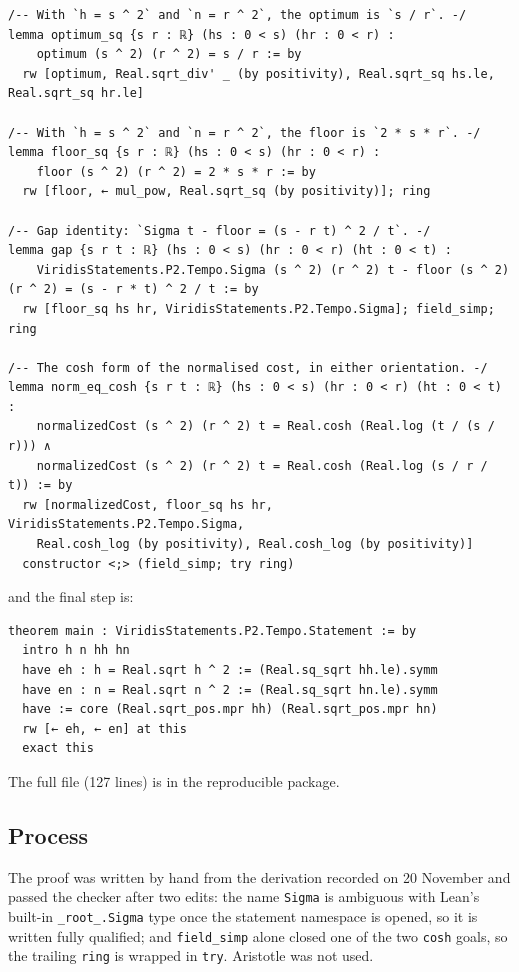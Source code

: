 \documentclass[11pt]{article}
\theoremstyle{definition}
\theoremstyle{remark}
\begin{document}
\begin{lstlisting}
/-- With `h = s ^ 2` and `n = r ^ 2`, the optimum is `s / r`. -/
lemma optimum_sq {s r : ℝ} (hs : 0 < s) (hr : 0 < r) :
    optimum (s ^ 2) (r ^ 2) = s / r := by
  rw [optimum, Real.sqrt_div' _ (by positivity), Real.sqrt_sq hs.le, Real.sqrt_sq hr.le]

/-- With `h = s ^ 2` and `n = r ^ 2`, the floor is `2 * s * r`. -/
lemma floor_sq {s r : ℝ} (hs : 0 < s) (hr : 0 < r) :
    floor (s ^ 2) (r ^ 2) = 2 * s * r := by
  rw [floor, ← mul_pow, Real.sqrt_sq (by positivity)]; ring

/-- Gap identity: `Sigma t - floor = (s - r t) ^ 2 / t`. -/
lemma gap {s r t : ℝ} (hs : 0 < s) (hr : 0 < r) (ht : 0 < t) :
    ViridisStatements.P2.Tempo.Sigma (s ^ 2) (r ^ 2) t - floor (s ^ 2) (r ^ 2) = (s - r * t) ^ 2 / t := by
  rw [floor_sq hs hr, ViridisStatements.P2.Tempo.Sigma]; field_simp; ring

/-- The cosh form of the normalised cost, in either orientation. -/
lemma norm_eq_cosh {s r t : ℝ} (hs : 0 < s) (hr : 0 < r) (ht : 0 < t) :
    normalizedCost (s ^ 2) (r ^ 2) t = Real.cosh (Real.log (t / (s / r))) ∧
    normalizedCost (s ^ 2) (r ^ 2) t = Real.cosh (Real.log (s / r / t)) := by
  rw [normalizedCost, floor_sq hs hr, ViridisStatements.P2.Tempo.Sigma,
    Real.cosh_log (by positivity), Real.cosh_log (by positivity)]
  constructor <;> (field_simp; try ring)
\end{lstlisting}
and the final step is:
\begin{lstlisting}
theorem main : ViridisStatements.P2.Tempo.Statement := by
  intro h n hh hn
  have eh : h = Real.sqrt h ^ 2 := (Real.sq_sqrt hh.le).symm
  have en : n = Real.sqrt n ^ 2 := (Real.sq_sqrt hn.le).symm
  have := core (Real.sqrt_pos.mpr hh) (Real.sqrt_pos.mpr hn)
  rw [← eh, ← en] at this
  exact this
\end{lstlisting}
The full file (127 lines) is in the reproducible package.

\subsection{Process}
The proof was written by hand from the derivation recorded on 20 November and passed the checker after two edits:
the name \texttt{Sigma} is ambiguous with Lean's built-in \texttt{\_root\_.Sigma} type once the statement namespace is opened, so it is
written fully qualified; and \texttt{field\_simp} alone closed one of the two \texttt{cosh} goals, so the trailing \texttt{ring} is wrapped in \texttt{try}.
Aristotle was not used.
\end{document}
